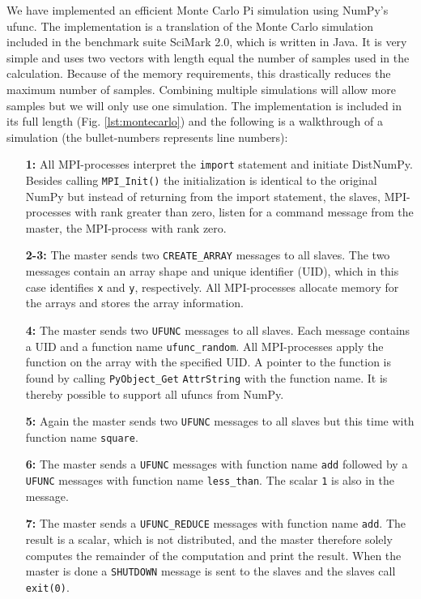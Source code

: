 \documentclass{sigplanconf}
\begin{document}
We have implemented an efficient Monte Carlo Pi simulation using NumPy's ufunc. The implementation is a translation of the Monte Carlo simulation included in the benchmark suite SciMark 2.0\cite{SciMark}, which is written in Java. It is very simple and uses two vectors with length equal the number of samples used in the calculation. Because of the memory requirements, this drastically reduces the maximum number of samples. Combining multiple simulations will allow more samples but we will only use one simulation. The implementation is included in its full length (Fig. \ref{lst:montecarlo}) and the following is a walkthrough of a simulation (the bullet-numbers represents line numbers):

\begin{enumerate}
\item[\textbf{1:}] All MPI-processes interpret the \texttt{import} statement and initiate DistNumPy. Besides calling \texttt{MPI\_Init()} the initialization is identical to the original NumPy but instead of returning from the import statement, the slaves, MPI-processes with rank greater than zero, listen for a command message from the master, the MPI-process with rank zero.
\item[\textbf{2-3:}] The master sends two \texttt{CREATE\_ARRAY} messages to all slaves. The two messages contain an array shape and unique identifier (UID), which in this case identifies \texttt{x} and \texttt{y}, respectively. All MPI-processes allocate memory for the arrays and stores the array information.
\item[\textbf{4:}] The master sends two \texttt{UFUNC} messages to all slaves. Each message contains a UID and a function name \texttt{ufunc\_random}. All MPI-processes apply the function on the array with the specified UID. A pointer to the function is found by calling \texttt{PyObject\_Get} \texttt{AttrString} with the function name. It is thereby possible to support all ufuncs from NumPy.
\item[\textbf{5:}] Again the master sends two \texttt{UFUNC} messages to all slaves but this time with function name \texttt{square}.
\item[\textbf{6:}] The master sends a \texttt{UFUNC} messages with function name \texttt{add} followed by a \texttt{UFUNC} messages with function name \texttt{less\_than}. The scalar \texttt{1} is also in the message.
\item[\textbf{7:}] The master sends a \texttt{UFUNC\_REDUCE} messages with function name \texttt{add}. The result is a scalar, which is not distributed, and the master therefore solely computes the remainder of the computation and print the result. When the master is done a \texttt{SHUTDOWN} message is sent to the slaves and the slaves call \texttt{exit(0)}.
\end{enumerate}
\end{document}
